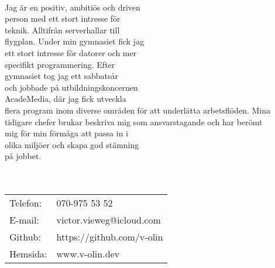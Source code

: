 \documentclass[11pt,oneside,a4paper,titlepage]{article}
\begin{document}
\begin{tcolorbox}
    \begin{minipage}[t]{8cm}
        \vspace*{-18.2pt}
        \begin{tcolorbox}[grow to left by=15pt,colframe=sup-lgray,colback=sup-lgray,sharp corners]
            {\selectfont
                \\
                Jag är en positiv, ambitiös och driven\\
                person med ett stort intresse för\\
                teknik. Alltifrån serverhallar till\\
                flygplan. Under min gymnasiet fick jag\\
                ett stort intresse för datorer och mer\\
                specifikt programmering.
                Efter\\gymnasiet tog jag ett sabbatsår\\
                och jobbade på utbildningskoncernen\\
                AcadeMedia, där jag fick utveckla\\
                flera program inom diverse områden
                för att underlätta arbetsflöden. Mina\\
                tidigare chefer brukar beskriva
                mig som ansvarstagande och har berömt\\
                mig för min förmåga att passa in i\\
                olika miljöer och skapa god stämning\\
                på jobbet.\\\\
                \\
                \vspace*{15pt}
                \begin{tabular}{l l}
                    \\Telefon: & 070-975 53 52 \\
                    E-mail: & victor.vieweg@icloud.com \\
                    Github: & https://github.com/v-olin \\
                    Hemsida: & www.v-olin.dev \\

\end{tabular}}
\end{tcolorbox}
\end{minipage}
\end{tcolorbox}
\end{document}
